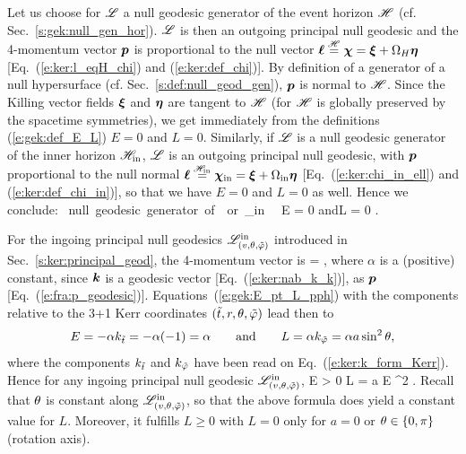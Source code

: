 \begin{example} \label{x:gek:null_generator_hor}
Let us choose for $\mathscr{L}$ a null geodesic generator of the event horizon $\mathscr{H}$
(cf. Sec.~\ref{s:gek:null_gen_hor}). $\mathscr{L}$ is then an outgoing principal null
geodesic and the 4-momentum vector $\bm{p}$ is proportional to the null vector
$\bm{\ell} \stackrel{\mathscr{H}}{=} \bm{\chi} = \bm{\xi} + \Omega_H \bm{\eta}$ [Eq.~(\ref{e:ker:l_eqH_chi})
and (\ref{e:ker:def_chi})].
By definition of a
generator of a null hypersurface (cf. Sec.~\ref{s:def:null_geod_gen}),
$\bm{p}$ is normal to $\mathscr{H}$. Since the Killing vector fields $\bm{\xi}$ and $\bm{\eta}$
are tangent to $\mathscr{H}$ (for $\mathscr{H}$ is globally preserved by the
spacetime symmetries), we get immediately from
the definitions (\ref{e:gek:def_E_L}) $E=0$ and $L=0$.
Similarly, if $\mathscr{L}$ is a null geodesic generator of the
inner horizon $\mathscr{H}_{\rm in}$, $\mathscr{L}$ is an outgoing principal null
geodesic, with $\bm{p}$ proportional to
the null normal
$\bm{\ell} \stackrel{\mathscr{H}_{\rm in}}{=} \bm{\chi}_{\rm in} = \bm{\xi} + \Omega_{\rm in} \bm{\eta}$
[Eq.~(\ref{e:ker:chi_in_ell}) and (\ref{e:ker:def_chi_in})], so that we
have $E=0$ and $L=0$ as well. Hence we conclude:
\be \label{e:gek:generator_hor_E_L_zero}
    \Li \ \mbox{null geodesic generator of}\ \Hor\ \mbox{or}\ \Hor_{\rm in}
   \  \Longrightarrow\  E = 0 \quad\mbox{and}\quad L = 0 .
\ee
\end{example}

\begin{example} \label{x:gek:ingoing_null_E_L}
For the ingoing principal null geodesics $\mathscr{L}^{\rm in}_{(v,\theta,{\tilde\varphi})}$
introduced in Sec.~\ref{s:ker:principal_geod}, the 4-momentum vector
is
\be \label{e:gek:p_alpha_k}
     = \alpha {} ,
\ee
where $\alpha$ is a (positive) constant, since $\bm{k}$ is a geodesic vector
[Eq.~(\ref{e:ker:nab_k_k})], as $\bm{p}$ [Eq.~(\ref{e:fra:p_geodesic})].
Equations~(\ref{e:gek:E_pt_L_pph}) with the components relative to the 3+1 Kerr coordinates
$({\tilde t}, r, \theta, {\tilde\varphi})$ lead then to
\[
    E = - \alpha k_{{\tilde t}} = - \alpha(-1) = \alpha \qquad\mbox{and}\qquad
   L = \alpha k_{{\tilde\varphi}} = \alpha a \sin^2\theta,
\]
where the components $k_{{\tilde t}}$ and $k_{{\tilde\varphi}}$
have been read on Eq.~(\ref{e:ker:k_form_Kerr}).
Hence for any ingoing principal null geodesic $\mathscr{L}^{\rm in}_{(v,\theta,{\tilde\varphi})}$,
\be \label{e:gek:ingoing_null_E_L}
    E > 0 \qand L = a E \sin^2 \th .
\ee
Recall that $\theta$ is constant along $\mathscr{L}^{\rm in}_{(v,\theta,{\tilde\varphi})}$, so that
the above formula does yield a constant value for $L$. Moreover, it fulfills
$L\geq 0$ with $L=0$ only for $a=0$ or $\theta\in\{0,\pi\}$ (rotation axis).
\end{example}

